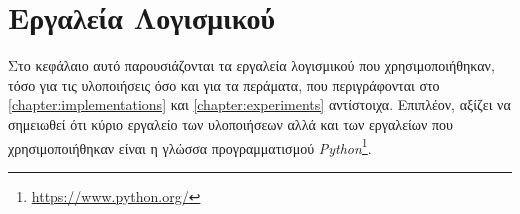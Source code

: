 \chapter{Εργαλεία Λογισμικού}
\label{chapter:tools}

Στο κεφάλαιο αυτό παρουσιάζονται τα εργαλεία λογισμικού που χρησιμοποιήθηκαν, τόσο για τις υλοποιήσεις όσο και για τα περάματα, που περιγράφονται στο \autoref{chapter:implementations} και  \autoref{chapter:experiments} αντίστοιχα. Επιπλέον, αξίζει να σημειωθεί ότι κύριο εργαλείο των υλοποιήσεων αλλά και των εργαλείων που χρησιμοποιήθηκαν είναι η γλώσσα προγραμματισμού \emph{Python}\footnote{\url{https://www.python.org/}}.









